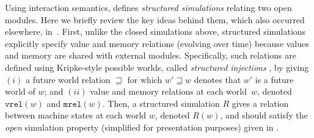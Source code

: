 
Using interaction semantics, \ccc{} defines \emph{structured
  simulations} relating two open modules.
Here we briefly review the key ideas behind them,
which also occurred elsewhere, \eg in~\cite{pb,neis:pilsner,PLDI15}.
First, unlike the closed simulations above,
structured simulations explicitly specify value and memory relations
(evolving over time) because values and memory are shared with external modules.
Specifically, such relations are defined using Kripke-style possible worlds,
called \emph{structured injections} ,
by giving $(i)$ a future world relation $\sqsupseteq$ for which
$w' \sqsupseteq w$ denotes that $w'$ is a future world of $w$;
and $(ii)$ value and memory relations at each world~$w$, denoted
$\mathtt{vrel}(w)$ and $\mathtt{mrel}(w)$.  Then, a
structured simulation $R$ gives a relation between machine
states at each world $w$, denoted $R(w)$, and should satisfy the
\emph{open} simulation property (simplified for presentation purposes) given in .
